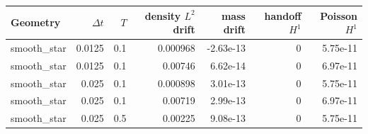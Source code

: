 \begin{tabular}{lrrrrrr}
\toprule
Geometry & $\Delta t$ & $T$ & density $L^2$ drift & mass drift & handoff $H^1$ & Poisson $H^1$\\
\midrule
smooth\_star & 0.0125 & 0.1 & 0.000968 & -2.63e-13 & 0 & 5.75e-11\\
smooth\_star & 0.0125 & 0.1 & 0.00746 & 6.62e-14 & 0 & 6.97e-11\\
smooth\_star & 0.025 & 0.1 & 0.000898 & 3.01e-13 & 0 & 5.75e-11\\
smooth\_star & 0.025 & 0.1 & 0.00719 & 2.99e-13 & 0 & 6.97e-11\\
smooth\_star & 0.025 & 0.5 & 0.00225 & 9.08e-13 & 0 & 5.75e-11\\
\bottomrule
\end{tabular}
